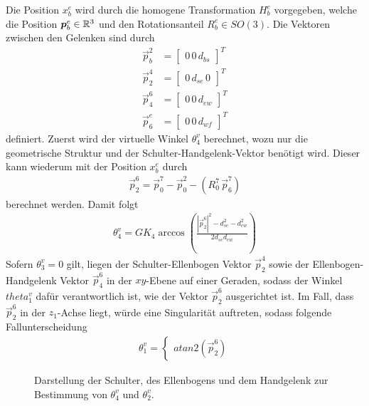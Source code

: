Die Position $x_b^e$ wird durch die homogene Transformation $H_b^e$ vorgegeben, welche die Position $\boldsymbol{p}_b^e \in \mathbb{R}^3$ und den Rotationsanteil $R_b^e \in SO(3)$. Die Vektoren zwischen den Gelenken sind durch
\begin{align}
\vec{p}_b^2 &=
\begin{bmatrix}
 0 \, 0 \, d_{bs}
\end{bmatrix}^T
 \\
\vec{p}_2^4 &= 
\begin{bmatrix}
0 \, d_{se} \, 0
\end{bmatrix}^T
\\
\vec{p}_4^6 &=
\begin{bmatrix}
0 \, 0 \, d_{ew}
\end{bmatrix}^T
\\
\vec{p}_6^e &= 
\begin{bmatrix}
0 \, 0 \, d_{wf}
\end{bmatrix}^T
\end{align}
definiert. Zuerst wird der virtuelle Winkel $\theta_4^v$ berechnet, wozu nur die geometrische Struktur und der Schulter-Handgelenk-Vektor benötigt wird. Dieser kann wiederum mit der Position $x_b^e$ durch
\begin{align}
\vec{p}_2^6 = \vec{p}_0^7 - \vec{p}_0^2 - (R_0^7 \, \vec{p}_6^7)
\end{align}
berechnet werden. Damit folgt
\begin{align}
\theta_4^v = GK_4 \arccos \left( \frac{|\vec{p}_2^6|^2-d_{se}^2-d_{ew}^2}{2 d_{se} d_{ew}}\right )
\end{align}
Sofern $\theta_3^v=0$ gilt, liegen der Schulter-Ellenbogen Vektor $\vec{p}_2^4$ sowie der Ellenbogen-Handgelenk Vektor $\vec{p}_4^6$ in der $xy$-Ebene auf einer Geraden, sodass der Winkel $theta_1^v$ dafür verantwortlich ist, wie der Vektor $\vec{p}_2^6$ ausgerichtet ist. Im Fall, dass $\vec{p}_2^6$ in der $z_1$-Achse liegt, würde eine Singularität auftreten, sodass folgende Fallunterscheidung 
\begin{align}
\theta_1^v = 
\begin{cases}
atan2(\vec{p}_2^6)
\end{cases}
\end{align} 
\begin{figure}
	\centering
	\caption{Darstellung der Schulter, des Ellenbogens und dem Handgelenk zur Bestimmung von $\theta_4^v$ und $\theta_2^v$.}
	\label{fig:theta_v_calculation}
\end{figure}


